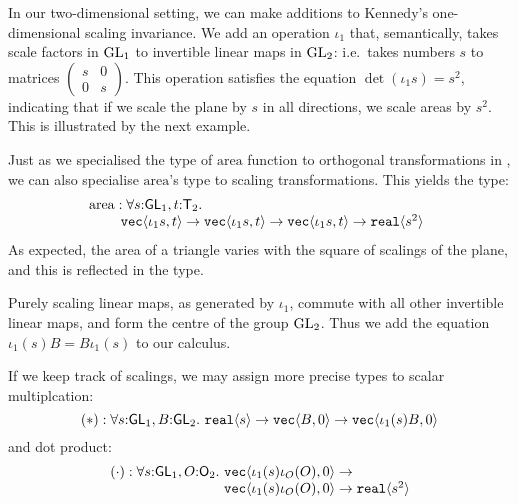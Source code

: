 In our two-dimensional setting, we can make additions to Kennedy's
one-dimensional scaling invariance. We add an operation $\iota_1$
that, semantically, takes scale factors in $\mathrm{GL}_1$ to invertible
linear maps in $\mathrm{GL}_2$: i.e.~takes numbers $s$ to matrices $\left(
  \begin{smallmatrix}s & 0 \\ 0 & s\end{smallmatrix}\right)$.  This
operation satisfies the equation $\det (\iota_1 s) = s^2$, indicating
that if we scale the plane by $s$ in all directions, we scale areas by
$s^2$. This is illustrated by the next example.

\begin{example}\label{ex:area-of-triangle-2}
  Just as we specialised the type of $\mathrm{area}$ function to
  orthogonal transformations in , we can
  also specialise $\mathrm{area}$'s type to scaling
  transformations. This yields the type:
  \begin{displaymath}
    \begin{array}{@{}l}
      \mathrm{area} : \forall s\mathord:\SynGL{1}, t\mathord:\SynTransl{2}.\ \\
      \hspace{0.8cm} \tyPrim{vec}{\iota_1s, t} \to \tyPrim{vec}{\iota_1s, t} \to \tyPrim{vec}{\iota_1s, t} \to \tyPrim{real}{s^2}
    \end{array}
  \end{displaymath}
  As expected, the area of a triangle varies with the square of
  scalings of the plane, and this is reflected in the type.
\end{example}

Purely scaling linear maps, as generated by $\iota_1$, commute with
all other invertible linear maps, and form the centre of the group
$\mathrm{GL}_2$. Thus we add the equation $\iota_1(s)B = B\iota_1(s)$ to our
calculus.

If we keep track of scalings, we may assign more precise types to
scalar multiplcation:
\begin{displaymath}
  (*) : \forall s \mathord: \mathsf{GL}_1, B \mathord: \mathsf{GL}_2.\ \texttt{real}\langle s \rangle \to \texttt{vec}\langle B,0 \rangle \to \texttt{vec}\langle \iota_1(s)B,0 \rangle
\end{displaymath}
and dot product:
\begin{displaymath}
  \begin{array}{l@{}l}
    (\cdot) : \forall s \mathord: \SynGL{1}, O \mathord: \SynOrth{2}.\ & \tyPrim{vec}{\iota_1(s)\iota_O(O),0} \to\\
    &\tyPrim{vec}{\iota_1(s)\iota_O(O),0} \to \tyPrim{real}{s^2}
  \end{array}
\end{displaymath}

